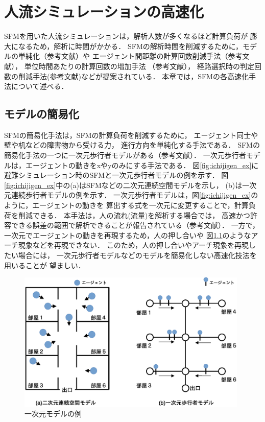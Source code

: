\chapter{人流シミュレーションの高速化}
\label{sec:survey}
SFMを用いた人流シミュレーションは，解析人数が多くなるほど計算負荷が
膨大になるため，解析に時間がかかる．
SFMの解析時間を削減するために，モデルの単純化（参考文献）や
エージェント間距離の計算回数削減手法（参考文献），
単位時間あたりの計算回数の増加手法 （参考文献），
経路選択時の判定回数の削減手法(参考文献)などが提案されている．
本章では，SFMの各高速化手法について述べる．

\section{モデルの簡易化}
SFMの簡易化手法は，SFMの計算負荷を削減するために，
エージェント同士や壁や机などの障害物から受ける力，
進行方向を単純化する手法である．
SFMの簡易化手法の一つに一次元歩行者モデルがある（参考文献）．
一次元歩行者モデルは，エージェントの動きをxやyのみにする手法である．
図\ref{fig:ichijigen_ex}に避難シミュレーション時のSFMと一次元歩行者モデルの例を示す．
図\ref{fig:ichijigen_ex}中の(a)はSFMなどの二次元連続空間モデルを示し，
(b)は一次元連続歩行者モデルの例を示す．
一次元歩行者モデルは，図\ref{fig:ichijigen_ex}のように，エージェントの動きを
算出する式を一次元に変更することで，計算負荷を削減できる．
本手法は，人の流れ(流量)を解析する場合では，
高速かつ許容できる誤差の範囲で解析できることが報告されている（参考文献）．
一方で，一次元でエージェントの動きを再現するため，人の押し合いや
図\ref{fig:atigenshou}のようなアーチ現象などを再現できない．
このため，人の押し合いやアーチ現象を再現したい場合には，
一次元歩行者モデルなどのモデルを簡易化しない高速化技法を用いることが
望ましい．



\begin{figure}[hbtp]
 \begin{center}
  \includegraphics[width=11cm,clip]{figure/ichijigen_ex.eps}
  \caption{一次元モデルの例}
  \label{fig:atigenshou}
 \end{center}
\end{figure}

